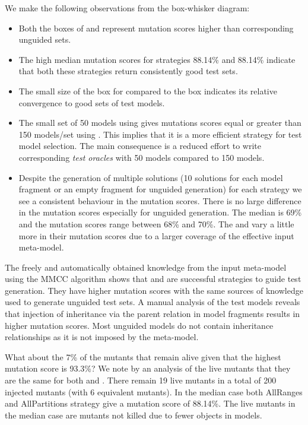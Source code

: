 We make the following observations from the box-whisker diagram:
\begin{itemize}
	\item Both the boxes of {\AllRanges} and {\AllPartitions} represent mutation scores higher than corresponding unguided sets.
	\item The high median mutation scores for strategies {\AllRanges} 88.14\% and {\AllPartitions} 88.14\% indicate that both these strategies return consistently good test sets.
	\item The small size of the box for {\AllPartitions} compared to the {\AllRanges} box indicates its relative convergence to good sets of test models.
	\item The small set of 50 models using {\AllPartitions} gives mutations scores equal or greater than 150 models/set using {\AllRanges}. This implies that it is a more efficient strategy for test model selection. The main consequence is a reduced effort to write corresponding \emph{test oracles} \cite{mottu2008} with 50 models compared to 150 models.
	\item Despite the generation of multiple solutions (10 solutions  for each model fragment or an empty fragment for unguided generation) for each strategy we see a consistent behaviour in the mutation scores. There is no large difference in the mutation scores especially for unguided generation. The median is 69\% and the mutation scores range between 68\% and 70\%. The {\AllRanges} and {\AllPartitions} vary a little more in their mutation scores due to a larger coverage of the effective input meta-model.
\end{itemize}	

The freely and automatically obtained knowledge from the input meta-model using the MMCC algorithm shows that  {\AllRanges} and {\AllPartitions} are successful strategies to guide test generation. They have higher mutation scores with the same sources of knowledge used to generate unguided test sets. A manual analysis of the test models reveals that injection of inheritance via the parent relation in model fragments results in higher mutation scores. Most unguided  models do not contain inheritance relationships as it is not imposed by the meta-model.
 
 What about the 7\% of the mutants that remain alive given that the highest mutation score is 93.3\%? We note by an analysis of the live mutants that they are the same for both {\AllRanges} and {\AllPartitions}. There remain 19 live mutants in a total of 200 injected
mutants (with 6 equivalent mutants). In the median case both AllRanges and AllPartitions strategy give a mutation score of 88.14\%. The live mutants in the median case are mutants not killed due to fewer objects in models.

